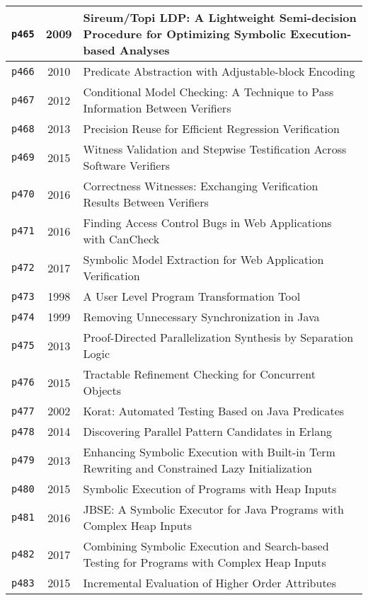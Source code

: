\begin{longtable}{| c | c | p{16cm} |}
  \hline
  \texttt{p465} & 2009 & Sireum/Topi LDP: A Lightweight Semi-decision Procedure for Optimizing Symbolic Execution-based Analyses \\
  \hline
  \texttt{p466} & 2010 & Predicate Abstraction with Adjustable-block Encoding \\
  \hline
  \texttt{p467} & 2012 & Conditional Model Checking: A Technique to Pass Information Between Verifiers \\
  \hline
  \texttt{p468} & 2013 & Precision Reuse for Efficient Regression Verification \\
  \hline
  \texttt{p469} & 2015 & Witness Validation and Stepwise Testification Across Software Verifiers \\
  \hline
  \texttt{p470} & 2016 & Correctness Witnesses: Exchanging Verification Results Between Verifiers \\
  \hline
  \texttt{p471} & 2016 & Finding Access Control Bugs in Web Applications with CanCheck \\
  \hline
  \texttt{p472} & 2017 & Symbolic Model Extraction for Web Application Verification \\
  \hline
  \texttt{p473} & 1998 & A User Level Program Transformation Tool \\
  \hline
  \texttt{p474} & 1999 & Removing Unnecessary Synchronization in Java \\
  \hline
  \texttt{p475} & 2013 & Proof-Directed Parallelization Synthesis by Separation Logic \\
  \hline
  \texttt{p476} & 2015 & Tractable Refinement Checking for Concurrent Objects \\
  \hline
  \texttt{p477} & 2002 & Korat: Automated Testing Based on Java Predicates \\
  \hline
  \texttt{p478} & 2014 & Discovering Parallel Pattern Candidates in Erlang \\
  \hline
  \texttt{p479} & 2013 & Enhancing Symbolic Execution with Built-in Term Rewriting and Constrained Lazy Initialization \\
  \hline
  \texttt{p480} & 2015 & Symbolic Execution of Programs with Heap Inputs \\
  \hline
  \texttt{p481} & 2016 & JBSE: A Symbolic Executor for Java Programs with Complex Heap Inputs \\
  \hline
  \texttt{p482} & 2017 & Combining Symbolic Execution and Search-based Testing for Programs with Complex Heap Inputs \\
  \hline
  \texttt{p483} & 2015 & Incremental Evaluation of Higher Order Attributes \\

\end{longtable}
